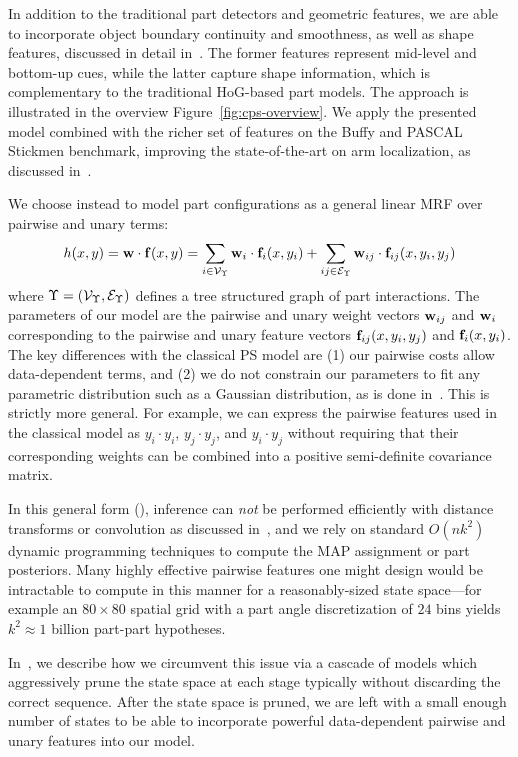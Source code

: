 In addition to the traditional part detectors and geometric features, we are 
able to incorporate object boundary continuity and smoothness, as well as shape 
features, discussed in detail in~. The former features 
represent mid-level and bottom-up cues, while the latter capture shape 
information, which is complementary to the traditional HoG-based part models.  
The approach is illustrated in the overview Figure~\ref{fig:cps-overview}. We 
apply the presented \CPS model combined with the richer set of features on the 
Buffy and PASCAL Stickmen benchmark, improving the state-of-the-art on arm 
localization, as discussed in~. 

\label{subsec:our_ps}
We choose instead to model part configurations as a general linear MRF over 
pairwise and unary terms:
\begin{align}
h(x,y)  = \mathbf{w} \cdot \mathbf{f}(x,y) = \sum_{i \in \mathcal{V}_\Upsilon} \mathbf{w}_i \cdot \mathbf{f}_i(x,y_i)  + 
\sum_{ij \in \mathcal{E}_\Upsilon} \mathbf{w}_{ij} \cdot \mathbf{f}_{ij}(x,y_i,y_j)
\label{eq:cps}
\end{align}
where $\Upsilon = (\mathcal{V}_\Upsilon,\mathcal{E}_\Upsilon)$ defines a tree structured graph of part 
interactions.  The parameters of our model are the pairwise and unary weight 
vectors $\mathbf{w}_{ij}$ and $\mathbf{w}_i$ corresponding to the pairwise and unary feature 
vectors $\mathbf{f}_{ij}(x,y_i,y_j)$ and $\mathbf{f}_i(x,y_i)$.   The key differences with the 
classical PS model are (1) our pairwise costs allow data-dependent terms, and 
(2) we do not constrain our parameters to fit any parametric distribution such 
as a Gaussian distribution, as is done 
in~\citet{felz05,devacrf,andriluka09,eichner09}.  This is strictly more 
general.  For example, we can express the pairwise features used in the 
classical model as $y_{i} \cdot y_{i}$, $y_{j}\cdot y_{j}$, and $y_{i}\cdot 
y_{j}$ without requiring that their corresponding weights can be combined into 
a positive semi-definite covariance matrix.

In this general form (), inference can {\em not} be performed 
efficiently with distance transforms or convolution as discussed 
in~, and we rely on standard $O(nk^2)$ dynamic programming 
techniques to compute the MAP assignment or part posteriors.  Many 
highly effective pairwise features one might design would be intractable to 
compute in this manner for a reasonably-sized state space---for example an $80 
\times 80$ spatial grid with a part angle discretization of $24$ bins yields 
$k^2 \approx 1$ billion part-part hypotheses.

In~, we describe how we circumvent this issue via a cascade of 
models which aggressively prune the state space at each stage typically without 
discarding the correct sequence.  After the state space is pruned, we are left 
with a small enough number of states to be able to incorporate powerful 
data-dependent pairwise and unary features into our model.


